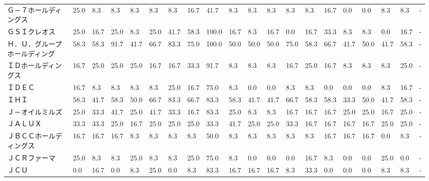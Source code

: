 \begin{tabular}{llllllllllllllllllll}
Ｇ－７ホールディングス     &   25.0 &    8.3 &       8.3 &       8.3 &        8.3 &    8.3 &   16.7 &   41.7 &     8.3 &     8.3 &    8.3 &   8.3 &    8.3 &    16.7 &     0.0 &   0.0 &   8.3 &   8.3 &     - \\
ＧＳＩクレオス         &   25.0 &   16.7 &      25.0 &       8.3 &       25.0 &   41.7 &   58.3 &  100.0 &    16.7 &     8.3 &   16.7 &   0.0 &   16.7 &    33.3 &     8.3 &   8.3 &   0.0 &  16.7 &     - \\
Ｈ．Ｕ．グループホールディング &   58.3 &   58.3 &      91.7 &      41.7 &       66.7 &   83.3 &   75.0 &  100.0 &    50.0 &    50.0 &   50.0 &  75.0 &   58.3 &    66.7 &    41.7 &  50.0 &  41.7 &  58.3 &     - \\
ＩＤホールディングス      &   16.7 &   25.0 &      25.0 &      25.0 &       16.7 &   16.7 &   33.3 &   91.7 &     8.3 &     8.3 &    8.3 &  16.7 &   25.0 &    16.7 &     8.3 &   8.3 &   8.3 &  25.0 &     - \\
ＩＤＥＣ            &   16.7 &    8.3 &       8.3 &       8.3 &        8.3 &   25.0 &   16.7 &   75.0 &     8.3 &     0.0 &    0.0 &   8.3 &    8.3 &     0.0 &     0.0 &   0.0 &   8.3 &  16.7 &     - \\
ＩＨＩ             &   58.3 &   41.7 &      58.3 &      50.0 &       66.7 &   83.3 &   66.7 &   83.3 &    58.3 &    41.7 &   41.7 &  66.7 &   58.3 &    58.3 &    33.3 &  50.0 &  41.7 &  58.3 &     - \\
Ｊ－オイルミルズ        &   25.0 &   33.3 &      41.7 &      25.0 &       41.7 &   33.3 &   16.7 &   83.3 &    25.0 &     8.3 &    8.3 &  16.7 &   16.7 &    16.7 &    25.0 &  25.0 &  16.7 &  25.0 &     - \\
ＪＡＬＵＸ           &   33.3 &   33.3 &      25.0 &      16.7 &       25.0 &   25.0 &   25.0 &   33.3 &    41.7 &    25.0 &   25.0 &  33.3 &   16.7 &    16.7 &    16.7 &  16.7 &  25.0 &  25.0 &     - \\
ＪＢＣＣホールディングス    &   16.7 &   16.7 &      16.7 &       8.3 &        8.3 &    8.3 &    8.3 &   50.0 &     8.3 &     8.3 &    8.3 &   8.3 &    8.3 &    16.7 &    16.7 &  16.7 &   0.0 &   8.3 &     - \\
ＪＣＲファーマ         &   25.0 &    8.3 &       8.3 &      25.0 &        8.3 &    8.3 &   25.0 &   75.0 &     8.3 &     0.0 &    0.0 &   0.0 &   16.7 &     8.3 &     0.0 &   0.0 &  25.0 &   0.0 &     - \\
ＪＣＵ             &    0.0 &   16.7 &       0.0 &       8.3 &       25.0 &    0.0 &    8.3 &   83.3 &    16.7 &    16.7 &   16.7 &   8.3 &   33.3 &     0.0 &     0.0 &   0.0 &   8.3 &   8.3 &     - \\

\end{tabular}
